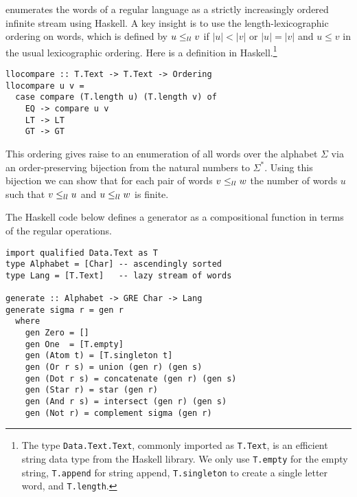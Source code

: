 \citet{DBLP:journals/jfp/McIlroy04} enumerates the words of a regular language as a
strictly increasingly ordered infinite stream using Haskell. A key insight is to use the
length-lexicographic ordering on words, which is defined by $u \le_{ll} v$ if $|u|<|v|$ or
$|u|=|v|$ and $u\le v$ in the usual lexicographic ordering. Here is a definition in Haskell.\footnote{The type
  \lstinline{Data.Text.Text}, commonly imported as \lstinline{T.Text}, is an efficient
  string data type from the Haskell library. We only use \lstinline{T.empty} for the empty
  string, \lstinline{T.append} for string append, \lstinline{T.singleton} to create a
  single letter word, and \lstinline{T.length}.}
\begin{lstlisting}
llocompare :: T.Text -> T.Text -> Ordering
llocompare u v =
  case compare (T.length u) (T.length v) of
    EQ -> compare u v
    LT -> LT
    GT -> GT
\end{lstlisting}
This ordering gives raise to an
enumeration of all words over the alphabet $\Sigma$ via an order-preserving
bijection from the natural numbers to $\Sigma^*$. Using this
bijection we can show that for each pair of words $v \le_{ll} w$ the
number of words $u$ such that $v \le_{ll} u$ and $u \le_{ll} w$ is finite. 


The Haskell code below defines a generator as a compositional function in terms of
the regular operations. 
\begin{lstlisting}
import qualified Data.Text as T
type Alphabet = [Char] -- ascendingly sorted
type Lang = [T.Text]   -- lazy stream of words

generate :: Alphabet -> GRE Char -> Lang
generate sigma r = gen r
  where
    gen Zero = []
    gen One  = [T.empty]
    gen (Atom t) = [T.singleton t]
    gen (Or r s) = union (gen r) (gen s)
    gen (Dot r s) = concatenate (gen r) (gen s)
    gen (Star r) = star (gen r)
    gen (And r s) = intersect (gen r) (gen s)
    gen (Not r) = complement sigma (gen r)
\end{lstlisting}

